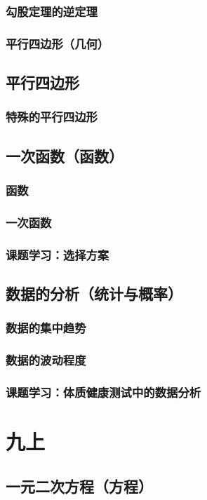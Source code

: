 \documentclass[cn,blue,10pt]{elegantbook}
\begin{document}
\section{勾股定理的逆定理}
\section{平行四边形（几何）}
\chapter{平行四边形}
\section{特殊的平行四边形}
\chapter{一次函数（函数）}
\section{函数}
\section{一次函数}
\section{课题学习：选择方案}
\chapter{数据的分析（统计与概率）}
\section{数据的集中趋势}
\section{数据的波动程度}
\section{课题学习：体质健康测试中的数据分析}
\part{九上}
\chapter{一元二次方程（方程）}
\end{document}
